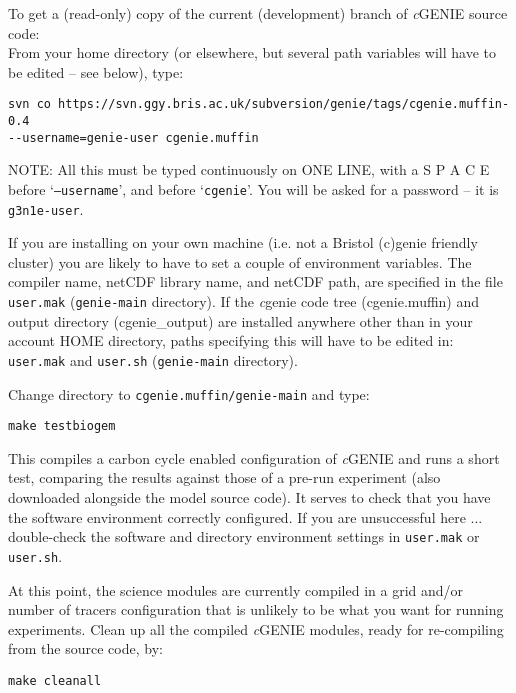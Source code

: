 \documentclass[10pt,twoside]{article}
\begin{document}
\begin{compactenum}
\item   To get a (read-only) copy of the current (development) branch of \textit{c}GENIE source code:
\\ From your home directory (or elsewhere, but several path variables will have to be edited -- see below), type:
\vspace{-5pt}\begin{verbatim}
svn co https://svn.ggy.bris.ac.uk/subversion/genie/tags/cgenie.muffin-0.4
--username=genie-user cgenie.muffin
\end{verbatim}\vspace{-5pt}
NOTE: All this must be typed continuously on ONE LINE, with a S P A C E before `\texttt{--username}', and before `\texttt{cgenie}'.
You will be asked for a password -- it is \texttt{g3n1e-user}.

\item   If you are installing on your own machine (i.e. not a Bristol (c)genie friendly cluster) you are likely to have to set a couple of environment variables. The compiler name, netCDF library name, and netCDF path, are specified in the file \texttt{user.mak} (\texttt{genie-main} directory). If the \textit{c}genie code tree (cgenie.muffin) and output directory (cgenie\_output) are installed anywhere other than in your account HOME directory, paths specifying this will have to be edited in: \texttt{user.mak} and \texttt{user.sh} (\texttt{genie-main} directory).
                
\item   Change directory to \texttt{cgenie.muffin/genie-main} and type:
\vspace{-5pt}\begin{verbatim}
make testbiogem
\end{verbatim}\vspace{-5pt}
This compiles a carbon cycle enabled configuration of \textit{c}GENIE and runs a short test, comparing the results against those of a pre-run experiment (also downloaded alongside the model source code). It serves to check that you have the software environment correctly configured. If you are unsuccessful here ... double-check the software and directory environment settings in \texttt{user.mak} or \texttt{user.sh}.

\item   At this point, the science modules are currently compiled in a grid and/or number of tracers configuration that is unlikely to be what you want for running experiments. Clean up all the compiled \textit{c}GENIE modules, ready for re-compiling from the source code, by:
\vspace{-5pt}\begin{verbatim}
make cleanall
\end{verbatim}\vspace{-5pt}
  
\end{compactenum}
\end{document}
